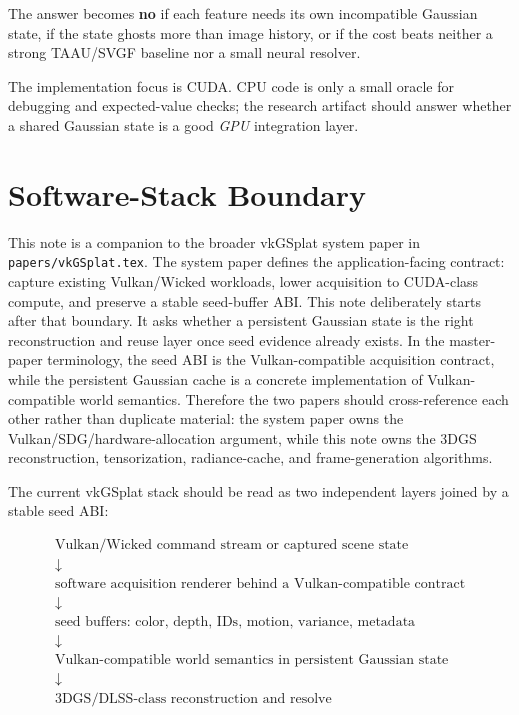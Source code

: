 \documentclass[11pt]{article}
\begin{document}
The answer becomes \textbf{no} if each feature needs its own incompatible
Gaussian state, if the state ghosts more than image history, or if the cost
beats neither a strong TAAU/SVGF baseline nor a small neural resolver.

The implementation focus is CUDA. CPU code is only a small oracle for
debugging and expected-value checks; the research artifact should answer
whether a shared Gaussian state is a good \emph{GPU} integration layer.

\section{Software-Stack Boundary}

This note is a companion to the broader vkGSplat system paper in
\texttt{papers/vkGSplat.tex}. The system paper defines the application-facing
contract: capture existing Vulkan/Wicked workloads, lower acquisition to
CUDA-class compute, and preserve a stable seed-buffer ABI. This note
deliberately starts after that boundary. It asks whether a persistent Gaussian
state is the right reconstruction and reuse layer once seed evidence already
exists. In the master-paper terminology, the seed ABI is the
Vulkan-compatible acquisition contract, while the persistent Gaussian cache is a
concrete implementation of Vulkan-compatible world semantics. Therefore the two
papers should cross-reference each other rather than duplicate material: the
system paper owns the Vulkan/SDG/hardware-allocation argument, while this note
owns the 3DGS reconstruction, tensorization, radiance-cache, and
frame-generation algorithms.

The current vkGSplat stack should be read as two independent layers joined by a
stable seed ABI:

\[
\begin{gathered}
\text{Vulkan/Wicked command stream or captured scene state}\\
\downarrow\\
\text{software acquisition renderer behind a Vulkan-compatible contract}\\
\downarrow\\
\text{seed buffers: color, depth, IDs, motion, variance, metadata}\\
\downarrow\\
\text{Vulkan-compatible world semantics in persistent Gaussian state}\\
\downarrow\\
\text{3DGS/DLSS-class reconstruction and resolve}
\end{gathered}
\]
\end{document}
